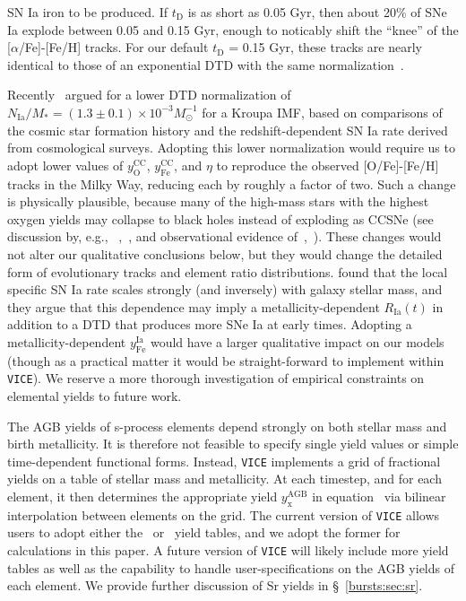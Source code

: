 SN Ia iron to be produced. If $t_\text{D}$ is as short as 0.05 Gyr, then 
about 20\% of SNe Ia explode between 0.05 and 0.15 Gyr, enough to noticably 
shift the ``knee'' of the [$\alpha$/Fe]-[Fe/H] tracks. For our default 
$t_\text{D}$ = 0.15 Gyr, these tracks are nearly identical to those of an 
exponential DTD with the same
normalization~\citep[see figure 11 of ][]{Weinberg2017b}.
\par 
Recently~\citet{Maoz2017} argued for a lower DTD normalization of 
$N_\text{Ia}/M_* = (1.3\pm0.1)\times10^{-3} M_\odot^{-1}$ for a Kroupa IMF, 
based on comparisons of the cosmic star formation history and the 
redshift-dependent SN Ia rate derived from cosmological surveys. Adopting this 
lower normalization would require us to adopt lower values of 
$y_\text{O}^\text{CC}$, $y_\text{Fe}^\text{CC}$, and $\eta$ to reproduce the 
observed [O/Fe]-[Fe/H] tracks in the Milky Way, reducing each by roughly a 
factor of two. Such a change is physically plausible, because many of the 
high-mass stars with the highest oxygen yields may collapse to black holes 
instead of exploding as CCSNe (see discussion by, e.g.,
~\citealp{Pejcha2015},~\citealp{Sukhbold2016}, and observational evidence 
of~\citealp{Gerke2015},~\citealp{Adams2017}). These changes would not alter our 
qualitative conclusions below, but they would change the detailed form of 
evolutionary tracks and element ratio distributions. \citet{Brown2019} found 
that the local specific SN Ia rate scales strongly (and inversely) with 
galaxy stellar mass, and they argue that this dependence may imply a 
metallicity-dependent $R_\text{Ia}(t)$ in addition to a DTD that produces more 
SNe Ia at early times. Adopting a metallicity-dependent $y_\text{Fe}^\text{Ia}$ 
would have a larger qualitative impact on our models (though as a practical 
matter it would be straight-forward to implement within \texttt{VICE}). We 
reserve a more thorough investigation of empirical constraints on elemental 
yields to future work. 
\par 
The AGB yields of s-process elements depend strongly on both stellar mass and
birth metallicity. It is therefore not feasible to specify single yield values 
or simple time-dependent functional forms. Instead, \texttt{VICE} implements 
a grid of fractional yields on a table of stellar mass and metallicity. At 
each timestep, and for each element, it then determines the appropriate yield 
$y_\text{x}^\text{AGB}$ in equation~ via bilinear 
interpolation between elements on the grid. The current version of 
\texttt{VICE} allows users to adopt either the~\citet{Cristallo2011} 
or~\citet{Karakas2010} yield tables, and we adopt the former for calculations 
in this paper. A future version of \texttt{VICE} will likely include more yield 
tables as well as the capability to handle user-specifications on the AGB 
yields of each element. We provide further discussion of Sr yields in 
\S~\ref{bursts:sec:sr}. 

